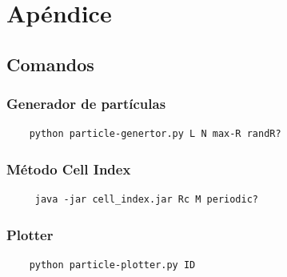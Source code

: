 \documentclass[a4paper]{article}
\begin{document}
\section{Apéndice}
\subsection{Comandos}
  \subsubsection{Generador de partículas}
  \begin{lstlisting}
    python particle-genertor.py L N max-R randR?
  \end{lstlisting}
  \subsubsection{Método Cell Index}
  \begin{lstlisting}
     java -jar cell_index.jar Rc M periodic?
  \end{lstlisting}
  \subsubsection{Plotter}
  \begin{lstlisting}
    python particle-plotter.py ID
  \end{lstlisting}
\end{document}
